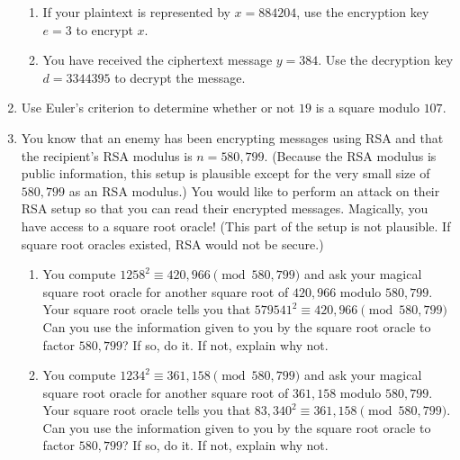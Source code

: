 \documentclass[12pt]{article}
\begin{document}
\begin{enumerate}
\begin{enumerate}
\item If your plaintext is represented by $x = 884204$, use the encryption key $e = 3$ to encrypt $x$.

\item You have received the ciphertext message $y = 384$.  Use the decryption key $d = 3344395$ to decrypt the message.  
\end{enumerate}

\item Use Euler's criterion to determine whether or not $19$ is a square modulo $107$. 

\item You know that an enemy has been encrypting messages using RSA and that the recipient's RSA modulus is $n = 580,799$.  (Because the RSA modulus is public information, this setup is plausible except for the very small size of $580,799$ as an RSA modulus.)  You would like to perform an attack on their RSA setup so that you can read their encrypted messages.  Magically, you have access to a square root oracle!  (This part of the setup is not plausible.  If square root oracles existed, RSA would not be secure.)  
\begin{enumerate}
\item You compute $1258^2 \equiv 420,966 \pmod{580,799}$ and ask your magical square root oracle for another square root of $420,966$ modulo $580,799$.  Your square root oracle tells you that $579541^2 \equiv 420,966 \pmod{580,799}$  Can you use the information given to you by the square root oracle to factor $580,799$?  If so, do it.  If not, explain why not.

\item You compute $1234^2\equiv 361,158 \pmod{580,799}$ and ask your magical square root oracle for another square root of $361,158 $ modulo $580,799$. Your square root oracle tells you that $83,340^2\equiv 361,158 \pmod{580,799}$.  Can you use the information given to you by the square root oracle to factor $580,799$?  If so, do it.  If not, explain why not.
\end{enumerate}
\end{enumerate}
\end{document}
